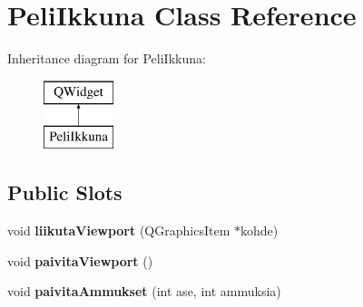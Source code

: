 \hypertarget{class_peli_ikkuna}{\section{Peli\-Ikkuna Class Reference}
\label{class_peli_ikkuna}
}
Inheritance diagram for Peli\-Ikkuna\-:\begin{figure}[H]
\begin{center}
\leavevmode
\includegraphics[height=2.000000cm]{class_peli_ikkuna}
\end{center}
\end{figure}
\subsection*{Public Slots}
\begin{DoxyCompactItemize}
\item 
\hypertarget{class_peli_ikkuna_a599ff7ea4e7065407a4cfc376a9e7a4d}{void {\bfseries liikuta\-Viewport} (Q\-Graphics\-Item $\ast$kohde)}\label{class_peli_ikkuna_a599ff7ea4e7065407a4cfc376a9e7a4d}

\item 
\hypertarget{class_peli_ikkuna_a646a8059ff792d36e7dd7c7cc9339945}{void {\bfseries paivita\-Viewport} ()}\label{class_peli_ikkuna_a646a8059ff792d36e7dd7c7cc9339945}

\item 
\hypertarget{class_peli_ikkuna_a14e0c209058d3044db9b782c8b4f4691}{void {\bfseries paivita\-Ammukset} (int ase, int ammuksia)}\label{class_peli_ikkuna_a14e0c209058d3044db9b782c8b4f4691}

\end{DoxyCompactItemize}
